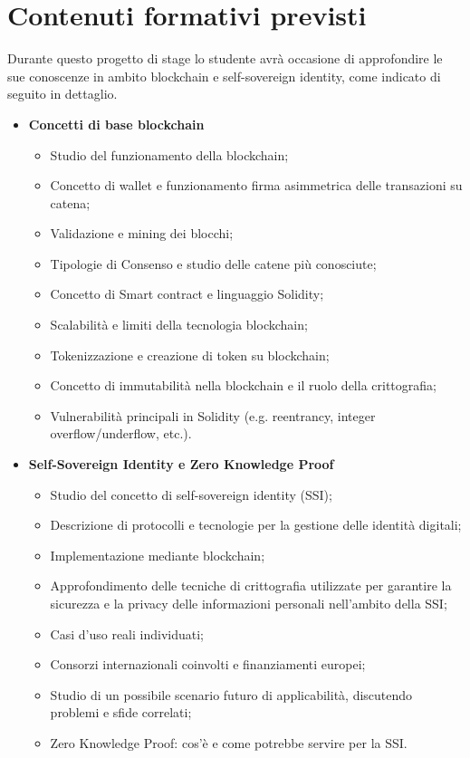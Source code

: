 \section*{Contenuti formativi previsti}
Durante questo progetto di stage lo studente avrà occasione di approfondire le sue conoscenze in ambito blockchain e self-sovereign identity,
come indicato di seguito in dettaglio.
\begin{itemize}
    \item \textbf{Concetti di base blockchain}
    \begin{itemize}
        \item Studio del funzionamento della blockchain;
        \item Concetto di wallet e funzionamento firma asimmetrica delle transazioni su catena;
        \item Validazione e mining dei blocchi;
        \item Tipologie di Consenso e studio delle catene più conosciute;
        \item Concetto di Smart contract e linguaggio Solidity;
        \item Scalabilità e limiti della tecnologia blockchain;
        \item Tokenizzazione e creazione di token su blockchain;
        \item Concetto di immutabilità nella blockchain e il ruolo della crittografia;
        \item Vulnerabilità principali in Solidity (e.g. reentrancy, integer overflow/underflow, etc.).
    \end{itemize}
    \item \textbf{Self-Sovereign Identity e Zero Knowledge Proof}
    \begin{itemize}
        \item Studio del concetto di self-sovereign identity (SSI);
        \item Descrizione di protocolli e tecnologie per la gestione delle identità digitali;
        \item Implementazione mediante blockchain;
        \item Approfondimento delle tecniche di crittografia utilizzate per garantire la sicurezza e la privacy delle informazioni personali nell'ambito della SSI;
        \item Casi d'uso reali individuati;
        \item Consorzi internazionali coinvolti e finanziamenti europei;
        \item Studio di un possibile scenario futuro di applicabilità, discutendo problemi e sfide correlati;
        \item Zero Knowledge Proof: cos'è e come potrebbe servire per la SSI.
    \end{itemize}
\end{itemize}


